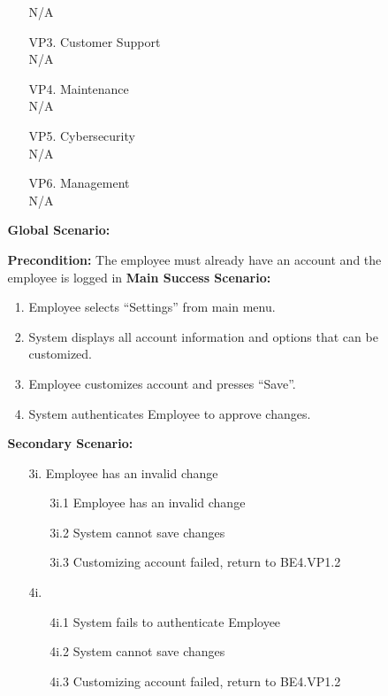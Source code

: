 \documentclass[]{article}
\begin{document}
\begin{enumerate}[{\bf BE1.}]
\begin{enumerate}[{\bf BE4.}]
\begin{enumerate}
            \indent N/A 
            \item[VP3.] Customer Support \\
            \indent N/A 
            \item[VP4.] Maintenance \\
            \indent N/A 
            \item[VP5.] Cybersecurity \\
            \indent N/A 
            \item[VP6.] Management \\
            \indent N/A 
        \end{enumerate}
        {\bf Global Scenario:}\\
        \begin{enumerate}
            \textbf{Precondition:} The employee must already have an account and the employee is logged in
            \textbf{Main Success Scenario:}
            \begin{enumerate}
                \item Employee selects “Settings” from main menu. 
                \item System displays all account information and options that can be customized. 
                \item Employee customizes account and presses “Save”. 
                \item System authenticates Employee to approve changes. 
            \end{enumerate}
            \textbf{Secondary Scenario:}
            \begin{enumerate}
                \item[3i.] Employee has an invalid change
                \begin{enumerate}
                    \item[3i.1] Employee has an invalid change
                    \item[3i.2] System cannot save changes
                    \item[3i.3] Customizing account failed, return to BE4.VP1.2
                \end{enumerate}
                \item[4i.]
                \begin{enumerate}
                    \item[4i.1] System fails to authenticate Employee
                    \item[4i.2] System cannot save changes
                    \item[4i.3] Customizing account failed, return to BE4.VP1.2
                \end{enumerate}
            \end{enumerate}
        \end{enumerate}
\end{enumerate}



\end{enumerate}
\end{document}
